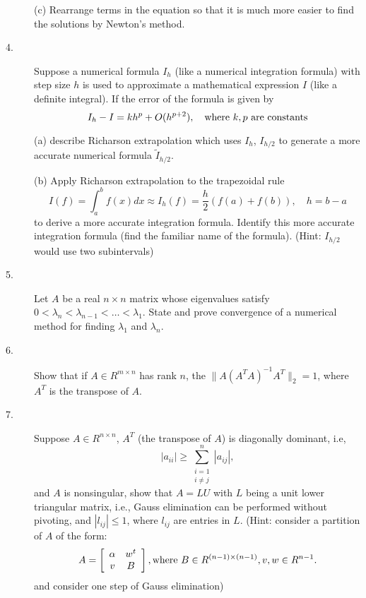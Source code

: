 \documentclass{article}
\begin{document}
\begin{description}
\item[\quad] (c)
Rearrange terms in the equation so that it is much more easier to find the
solutions by Newton's method.

\item[4.]
Suppose a numerical formula $I_h$ (like a numerical integration formula)
with step size $h$ is used to approximate a mathematical expression $I$
(like a definite integral). If the error of the formula is given by
$$I_h - I= kh^p + O(h^{p+2}), \quad \hbox{where\ } k,p \hbox{\ are\ }
  \hbox{constants}$$

\item[\quad] (a)
describe Richarson extrapolation which uses $I_h$, $I_{h/2}$ to generate
a more accurate numerical formula $\tilde I_{h/2}$.

\item[\quad] (b)
Apply Richarson extrapolation to the trapezoidal rule
$$I(f) = \int^b_a f(x) dx \approx I_h(f) = \frac{h}{2} (f(a) + f(b)), \quad
  h = b-a$$
to derive a more accurate integration formula. Identify this more accurate
integration formula (find the familiar name of the formula).
(Hint: $I_{h/2}$ would use two subintervals)

\item[5.]
Let $A$ be a real $n \times n$ matrix whose eigenvalues satisfy
$0 < \lambda_n < \lambda_{n-1} < \dots < \lambda_1$. State and prove
convergence of a numerical method for finding $\lambda_1$ and $\lambda_n$.

\item[6.]
Show that if $A \in R^{m \times n}$ has rank $n$, the
$\parallel A(A^TA)^{-1} A^T \parallel_2 = 1$, where $A^T$ is the transpose
of $A$.

\item[7.]
Suppose $A \in R^{n \times n}$, $A^T$ (the transpose of $A$) is diagonally
dominant, i.e,
$$|a_{ii}| \geq \sum^n_{\substack{ i =1 \\i \neq j}} |a_{ij}|,$$
and $A$ is nonsingular, show that $A=LU$ with $L$ being a unit lower
triangular matrix, i.e., Gauss elimination can be performed without pivoting,
and $|l_{ij}| \leq 1$, where $l_{ij}$ are entries in $L$. (Hint: consider
a partition of $A$ of the form:
$$A = \left[\begin{array}{cc}
        \alpha &w^t \\
        v &B
        \end{array} \right],
        \hbox{where\ } B \in R^{(n-1) \times (n-1)}, v,w \in R^{n-1}.$$
and consider one step of Gauss elimination)


\end{description}
\end{document}
